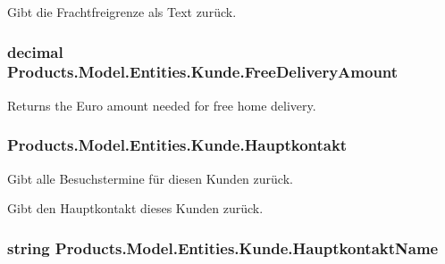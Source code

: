 Gibt die Frachtfreigrenze als Text zurück. 

\subsubsection[{\texorpdfstring{Free\+Delivery\+Amount}{FreeDeliveryAmount}}]{\setlength{\rightskip}{0pt plus 5cm}decimal Products.\+Model.\+Entities.\+Kunde.\+Free\+Delivery\+Amount\hspace{0.3cm}{\ttfamily [get]}}\hypertarget{class_products_1_1_model_1_1_entities_1_1_kunde_a36c7a9e33fb7cd4f9393e9649f79fb91}{}\label{class_products_1_1_model_1_1_entities_1_1_kunde_a36c7a9e33fb7cd4f9393e9649f79fb91}


Returns the Euro amount needed for free home delivery. 

\subsubsection[{\texorpdfstring{Hauptkontakt}{Hauptkontakt}}]{ Products.\+Model.\+Entities.\+Kunde.\+Hauptkontakt\hspace{0.3cm}{\ttfamily [get]}}\hypertarget{class_products_1_1_model_1_1_entities_1_1_kunde_a0a816839608eab259646739d351aa3e6}{}\label{class_products_1_1_model_1_1_entities_1_1_kunde_a0a816839608eab259646739d351aa3e6}


Gibt alle Besuchstermine für diesen Kunden zurück. 

Gibt den Hauptkontakt dieses Kunden zurück. 
\subsubsection[{\texorpdfstring{Hauptkontakt\+Name}{HauptkontaktName}}]{\setlength{\rightskip}{0pt plus 5cm}string Products.\+Model.\+Entities.\+Kunde.\+Hauptkontakt\+Name\hspace{0.3cm}{\ttfamily [get]}}\hypertarget{class_products_1_1_model_1_1_entities_1_1_kunde_a7379ca8a4f4b60db352f4bc42ff16a5b}{}\label{class_products_1_1_model_1_1_entities_1_1_kunde_a7379ca8a4f4b60db352f4bc42ff16a5b}



